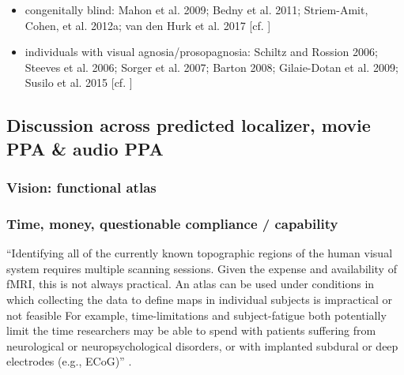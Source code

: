 

\begin{itemize}

\item congenitally blind:
    Mahon et al. 2009;
    Bedny et al. 2011;
    Striem-Amit, Cohen, et al. 2012a;
    van den Hurk et al. 2017
    [cf. \citet{rosenke2021probabilistic}]

\item individuals with visual agnosia/prosopagnosia:
    Schiltz and Rossion 2006;
    Steeves et al. 2006;
    Sorger et al. 2007;
    Barton 2008;
    Gilaie-Dotan et al. 2009;
    Susilo et al. 2015
    [cf. \citet{rosenke2021probabilistic}]

\end{itemize}

\subsection{Discussion across predicted localizer, movie PPA \& audio PPA}


\subsubsection{Vision: functional atlas}





\subsubsection{Time, money, questionable compliance / capability}

``Identifying all of the currently known topographic regions of the human visual
system requires multiple scanning sessions.
%
Given the expense and availability of fMRI, this is not always practical.
%
An atlas can be used under conditions in which collecting the data to define
maps in individual subjects is impractical or not feasible
%
For example, time-limitations and subject-fatigue both potentially limit the
time researchers may be able to spend with patients suffering from neurological
or neuropsychological disorders, or with implanted subdural or deep electrodes
(e.g., ECoG)'' \citep{wang2015probabilistic}.


